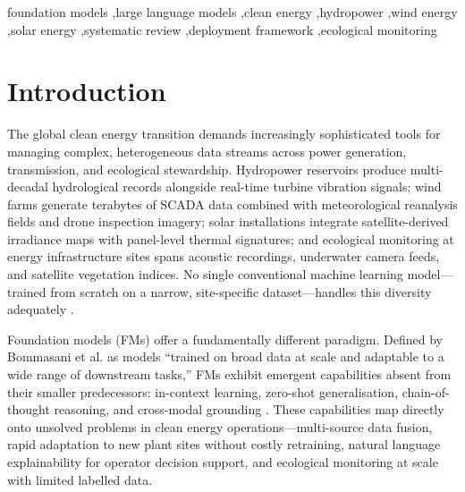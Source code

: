 \documentclass[preprint,12pt]{elsarticle}
\begin{document}
\begin{frontmatter}
\begin{keyword}
foundation models \sep large language models \sep clean energy \sep hydropower \sep wind energy \sep solar energy \sep systematic review \sep deployment framework \sep ecological monitoring
\end{keyword}

\end{frontmatter}

\section{Introduction}
\label{sec:introduction}

The global clean energy transition demands increasingly sophisticated tools for managing complex, heterogeneous data streams across power generation, transmission, and ecological stewardship. Hydropower reservoirs produce multi-decadal hydrological records alongside real-time turbine vibration signals; wind farms generate terabytes of SCADA data combined with meteorological reanalysis fields and drone inspection imagery; solar installations integrate satellite-derived irradiance maps with panel-level thermal signatures; and ecological monitoring at energy infrastructure sites spans acoustic recordings, underwater camera feeds, and satellite vegetation indices. No single conventional machine learning model---trained from scratch on a narrow, site-specific dataset---handles this diversity adequately \cite{wang2019dl_renewable_forecasting}.

Foundation models (FMs) offer a fundamentally different paradigm. Defined by Bommasani et al. \cite{bommasani2021opportunities} as models ``trained on broad data at scale and adaptable to a wide range of downstream tasks,'' FMs exhibit emergent capabilities absent from their smaller predecessors: in-context learning, zero-shot generalisation, chain-of-thought reasoning, and cross-modal grounding \cite{wei2022emergent}. These capabilities map directly onto unsolved problems in clean energy operations---multi-source data fusion, rapid adaptation to new plant sites without costly retraining, natural language explainability for operator decision support, and ecological monitoring at scale with limited labelled data.
\end{document}
